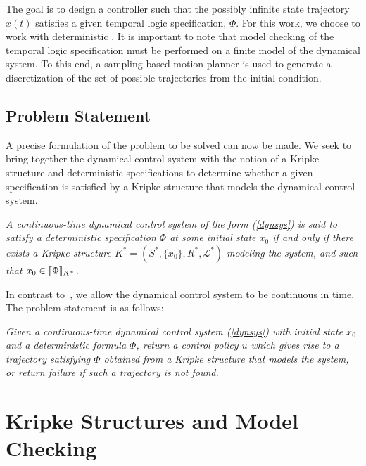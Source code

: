 The goal is to design a controller such that the possibly infinite state trajectory $x(t)$ satisfies a given temporal logic specification, $\Phi$. For this work, we choose to work with deterministic \mucalc{}. It is important to note that model checking of the temporal logic specification must be performed on a finite model of the dynamical system. To this end, a sampling-based motion planner is used to generate a discretization of the set of possible trajectories from the initial condition.


\subsection{Problem Statement}

A precise formulation of the problem to be solved can now be made. We seek to bring together the dynamical control system with the notion of a Kripke structure and deterministic \mucalc{} specifications to determine whether a given specification is satisfied by a Kripke structure that models the dynamical control system.

\begin{defn}
    {\em A continuous-time dynamical control system of the form (\ref{dynsys}) is said to satisfy a deterministic \mucalc{} specification $\Phi$ at some initial state $x_0$ if and only if there exists a Kripke structure 
    $K^* = (S^*,\{x_0\},R^*,\mathcal{L}^*)$ modeling the system, and such that $x_0 \in {\llbracket}{} \Phi {\rrbracket}{}_{K^*}$.}
\end{defn}

In contrast to~\cite{Karaman2009}, we allow the dynamical control system to be continuous in time. The problem statement is as follows:

{\em Given a continuous-time dynamical control system (\ref{dynsys}) with initial state $x_0$ and a deterministic \mucalc{} formula $\Phi$, return a control policy $u$ which gives rise to a trajectory satisfying $\Phi$ obtained from a Kripke structure that models the system, or return failure if such a trajectory is not found.}



\section{Kripke Structures and Model Checking}\label{chap:sstpaper:main}

